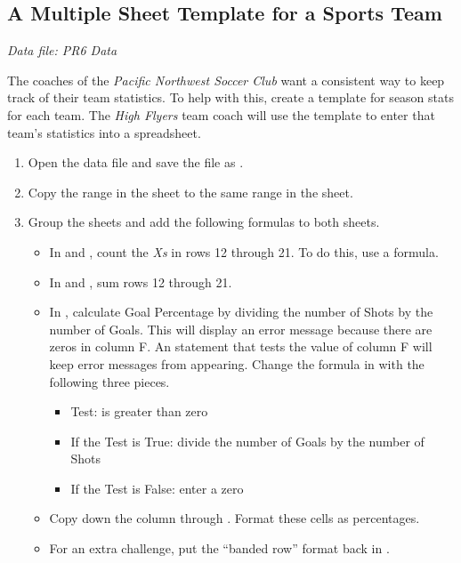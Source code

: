 \subsection{A Multiple Sheet Template for a Sports Team}

\textit{Data file: PR6 Data}

The coaches of the \textit{Pacific Northwest Soccer Club} want a consistent way to keep track of their team statistics. To help with this, create a template for season stats for each team. The \textit{High Flyers} team coach will use the template to enter that team's statistics into a spreadsheet.

\begin{enumerate}
	\item Open the data file  and save the file as .
	\item Copy the range  in the  sheet to the same range in the  sheet.
	\item Group the sheets and add the following formulas to both sheets.

	\begin{itemize}
		\item In  and , count the \textit{Xs} in rows 12 through 21. To do this, use a  formula.
		\item In  and , sum rows 12 through 21.
		\item In , calculate Goal Percentage by dividing the number of Shots by the number of Goals. This will display an error message because there are zeros in column F. An  statement that tests the value of column F will keep error messages from appearing. Change the formula in  with the following three pieces.
		\begin{itemize}
			\item Test: is  greater than zero
			\item If the Test is True: divide the number of Goals by the number of Shots
			\item If the Test is False: enter a zero
		\end{itemize}
		\item Copy  down the column through . Format these cells as percentages.
		\item For an extra challenge, put the ``banded row'' format back in .
		\end{itemize}	
	

\end{enumerate}
